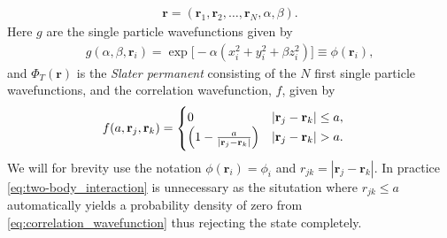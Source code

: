 \documentclass[
    a4paper, aps, twocolumn, floatfix, superscriptaddress,
    nofootinbib]{revtex4-1}
\newcommand{\vf}{\mathbf}
\newcommand{\1}{\mathds{1}}
\begin{document}
    \begin{align}
        \vf{r} = (\vf{r}_1, \vf{r}_2, \dots, \vf{r}_N, \alpha, \beta).
    \end{align}
    Here $g$ are the single particle wavefunctions given by
    \begin{align}
        g(\alpha, \beta, \vf{r}_i)
        = \exp\bigl[
            -\alpha(x_i^2 + y_i^2 + \beta z_i^2)
        \bigr] \equiv \phi(\vf{r}_i),
    \end{align}
    and $\Phi_T(\vf{r})$ is the \emph{Slater permanent} consisting of the $N$
    first single particle wavefunctions, and the correlation wavefunction, $f$,
    given by
    \begin{align}
        f(a, \vf{r}_j, \vf{r}_k)
        &=
        \begin{cases}
            0 & |\vf{r}_j - \vf{r}_k| \leq a, \\
            \Bigl(
                1 - \frac{a}{|\vf{r}_j - \vf{r}_k|}
            \Bigr) & |\vf{r}_j - \vf{r}_k| > a.
        \end{cases}
        \label{eq:correlation_wavefunction}
    \end{align}
    We will for brevity use the notation $\phi(\vf{r}_i) = \phi_i$ and $r_{jk} =
    |\vf{r}_j - \vf{r}_k|$. In practice \autoref{eq:two-body_interaction} is
    unnecessary as the situtation where $r_{jk} \leq a$ automatically yields a
    probability density of zero from \autoref{eq:correlation_wavefunction} thus
    rejecting the state completely.
\end{document}
